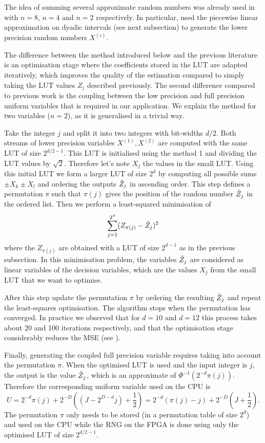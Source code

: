 The idea of summing several approximate random numbers was already used in \cite{Thomas2009ACO,Malik2016GaussianRN,thom14} with $n=8$, $n=4$ and $n=2$ respectively. In particular, \cite{Thomas2009ACO} used the piecewise linear approximation on dyadic intervals (see next subsection) to generate the lower precision random numbers $X^{(i)}$.

The difference between the method introduced below and the previous literature is an optimisation stage where the coefficients stored in the LUT are adapted iteratively, which improves the quality of the estimation compared to simply taking the LUT values $Z_j$ described previously. 
The second difference compared to previous work is the coupling between the low precision and full precision uniform variables that is required in our application.
We explain the method for two variables ($n=2$), as it is generalised in a trivial way. 

Take the integer $j$ and split it into two integers with bit-widths $d/2$. Both streams of lower precision variables $X^{(1)},X^{(2)}$ are computed with the same LUT of size $2^{d/2-1}$. This LUT is initialised using the method 1 and dividing the LUT values by $\sqrt{2}$. Therefore let's note $X_j$ the values in the small LUT. Using this initial LUT 
we form a larger LUT of size $2^{d}$ by computing all possible sums $\pm X_k\pm X_l$ and ordering the outputs $\Tilde{Z}_j$ in ascending order. This step defines a permutation $\pi$ such that $\pi(j)$ gives the position of the random number $\Tilde{Z}_j$ in the ordered list. Then we perform a least-squared minimisation of 
\begin{equation}
    \sum_{j=1}^{2^{d}} (Z_{\pi(j)}-\Tilde{Z}_j)^2
\end{equation}
where the $Z_{\pi(j)}$ are obtained with a LUT of size $2^{d-1}$ as in the previous subsection.
In this minimisation problem, the variables $\Tilde{Z}_j$ are considered as linear variables of the decision variables, which are the values $X_j$ from the small LUT that we want to optimise.

After this step update the permutation $\pi$ by ordering the resulting $\Tilde{Z}_j$ and repeat the least-squares optimisation. The algorithm stops when the permutation has converged.
In practice we observed that for $d=10$ and $d=12$ this process takes about 20 and 100 iterations respectively, and that the optimisation stage considerably reduces the MSE (see ).

Finally, generating the coupled full precision variable requires taking into account the permutation $\pi$. When the optimised LUT is used and the input integer is $j$, the output is the value $\Tilde{Z}_j$, which is an approximate of $\Phi^{-1}(2^{-d}\pi (j))$. Therefore the corresponding uniform variable used on the CPU is
\begin{equation}
    U = 2^{-d}\pi (j) + 2^{-D}\left((J-2^{D-d}j)+ \frac{1}{2}\right) = 2^{-d}(\pi (j) -j ) + 2^{-D}\left(J+\frac{1}{2}\right).
\end{equation}
The permutation $\pi$ only needs to be stored (in a permutation table of size $2^{d}$) and used on the CPU while the RNG on the FPGA is done using only the optimised LUT of size $2^{d/2-1}$.

